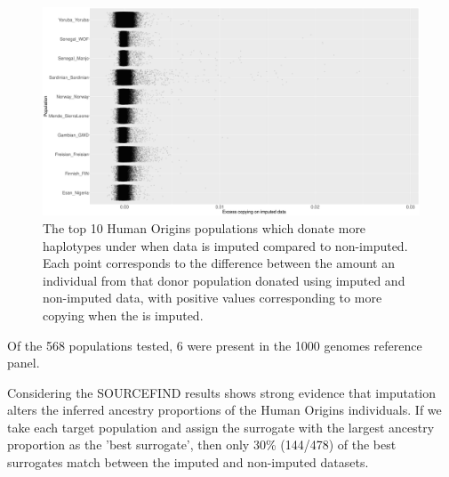 \begin{figure}[htp]
    \centering
    \includegraphics[width=1.0\textwidth]{../images/chapter3/imputed_excess_copying_pops.png}
    \caption{The top 10 Human Origins populations which donate more haplotypes under when data is imputed compared to non-imputed. Each point corresponds to the difference between the amount an individual from that donor population donated using imputed and non-imputed data, with positive values corresponding to more copying when the is imputed.}
    \label{fig:imputed_excess_copying_pops}
\end{figure}

Of the 568 populations tested, 6 were present in the 1000 genomes reference panel. 

Considering the SOURCEFIND results shows strong evidence that imputation alters the inferred ancestry proportions of the Human Origins individuals. If we take each target population and assign the surrogate with the largest ancestry proportion as the 'best surrogate', then only 30\% (144/478) of the best surrogates match between the imputed and non-imputed datasets. 









